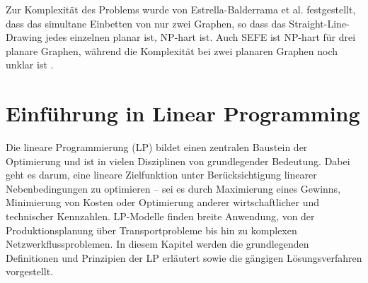 \documentclass[bachelor, german]{algothesis}
\begin{document}
Zur Komplexität des Problems wurde von Estrella-Balderrama et al.\cite{Estrella} festgestellt, dass das simultane Einbetten von nur zwei Graphen, so dass das Straight-Line-Drawing jedes einzelnen planar ist, NP-hart ist. Auch SEFE ist NP-hart für drei planare Graphen, während die Komplexität bei zwei planaren Graphen noch unklar ist \cite{Gassner}. 

\section{Einführung in Linear Programming}
Die lineare Programmierung (LP) bildet einen zentralen Baustein der Optimierung und ist in vielen Disziplinen von grundlegender Bedeutung. Dabei geht es darum, eine lineare Zielfunktion unter Berücksichtigung linearer Nebenbedingungen zu optimieren – sei es durch Maximierung eines Gewinns, Minimierung von Kosten oder Optimierung anderer wirtschaftlicher und technischer Kennzahlen.\newline
LP-Modelle finden breite Anwendung, von der Produktionsplanung über Transportprobleme bis hin zu komplexen Netzwerkflussproblemen. In diesem Kapitel werden die grundlegenden Definitionen und Prinzipien der LP erläutert sowie die gängigen Lösungsverfahren vorgestellt.
\end{document}
